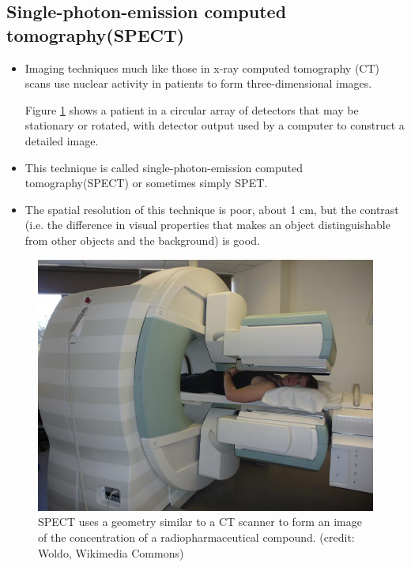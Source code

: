 \documentclass[12pt]{book}
\begin{document}
\subsection{Single-photon-emission computed tomography(SPECT)}
\begin{itemize}
    \item Imaging techniques much like those in x-ray computed tomography (CT) scans use nuclear activity in patients to form three-dimensional images.

	Figure \ref{fig:spect} shows a patient in a circular array of detectors that may be stationary or rotated, with detector output used by a computer to construct a detailed image.

\item This technique is called single-photon-emission computed tomography(SPECT) or sometimes simply SPET.

\item The spatial resolution of this technique is poor, about 1 cm, but the contrast (i.e. the difference in visual properties that makes an object distinguishable from other objects and the background) is good.

\end{itemize}
\begin{figure}[htpb]
    \centering
    \includegraphics{spect.jpeg}
    \caption{SPECT uses a geometry similar to a CT scanner to form an image of the concentration of a radiopharmaceutical compound. (credit: Woldo, Wikimedia Commons)}%
    \label{fig:spect}
\end{figure}
\end{document}
